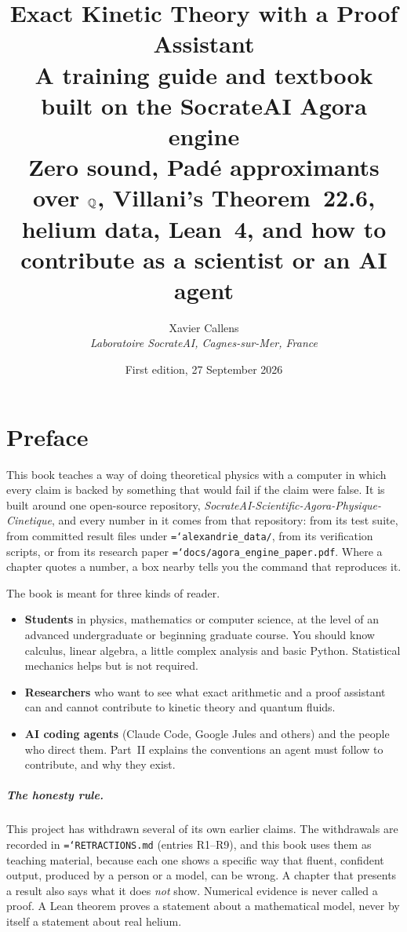 \documentclass[11pt,a4paper,openany]{book}
\title{\textbf{Exact Kinetic Theory with a Proof Assistant}\\[6pt]
\large A training guide and textbook built on the SocrateAI Agora engine\\[4pt]
\normalsize Zero sound, Padé approximants over $\mathbb{Q}$, Villani's Theorem~22.6,\\
helium data, Lean~4, and how to contribute as a scientist or an AI agent}
\author{Xavier Callens\\ \textit{Laboratoire SocrateAI, Cagnes-sur-Mer, France}}
\date{First edition, 27 September 2026}
\newcommand{\code}[1]{\texttt{\hyphenchar\font=`\-\relax #1}}
\theoremstyle{definition}
\theoremstyle{plain}
\begin{document}
\sloppy
\frontmatter
\maketitle

\chapter*{Preface}

This book teaches a way of doing theoretical physics with a computer in which every claim is
backed by something that would fail if the claim were false. It is built around one open-source
repository, \emph{SocrateAI-Scientific-Agora-Physique-Cinetique}, and every number in it comes
from that repository: from its test suite, from committed result files under
\code{alexandrie\_data/}, from its verification scripts, or from its research paper
\code{docs/agora\_engine\_paper.pdf}. Where a chapter quotes a number, a box nearby tells you the
command that reproduces it.

The book is meant for three kinds of reader.
\begin{itemize}
  \item \textbf{Students} in physics, mathematics or computer science, at the level of an advanced
        undergraduate or beginning graduate course. You should know calculus, linear algebra, a
        little complex analysis and basic Python. Statistical mechanics helps but is not required.
  \item \textbf{Researchers} who want to see what exact arithmetic and a proof assistant can and
        cannot contribute to kinetic theory and quantum fluids.
  \item \textbf{AI coding agents} (Claude Code, Google Jules and others) and the people who direct
        them. Part~II explains the conventions an agent must follow to contribute, and why they
        exist.
\end{itemize}

\paragraph{The honesty rule.} This project has withdrawn several of its own earlier claims. The
withdrawals are recorded in \code{RETRACTIONS.md} (entries R1--R9), and this book uses them as
teaching material, because each one shows a specific way that fluent, confident output, produced
by a person or a model, can be wrong. A chapter that presents a result also says what it does
\emph{not} show. Numerical evidence is never called a proof. A Lean theorem proves a statement
about a mathematical model, never by itself a statement about real helium.
\end{document}
